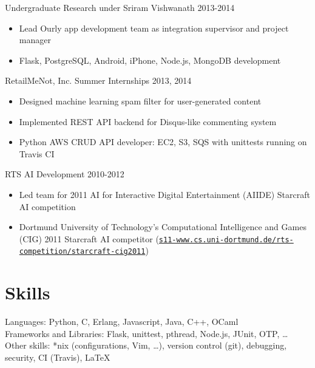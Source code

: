 \documentclass[line,margin]{res}
\begin{document}
\begin{resume}
\vspace{-6pt}
Undergraduate Research under Sriram Vishwanath
\hfill  2013-2014
    \begin{itemize} \itemsep -2pt %
    \item Lead Ourly app development team as integration supervisor and project manager
    \item Flask, PostgreSQL, Android, iPhone, Node.js, MongoDB development
    \end{itemize}

\vspace{-6pt}
RetailMeNot, Inc. Summer Internships
\hfill  2013, 2014
    \begin{itemize} \itemsep -2pt %
    \item Designed machine learning spam filter for user-generated content
    \item Implemented REST API backend for Disqus-like commenting system
    \item Python AWS CRUD API developer: EC2, S3, SQS with unittests running on Travis CI
    \end{itemize}

\vspace{-6pt}
RTS AI Development
\hfill  2010-2012
    \begin{itemize} \itemsep -2pt %
    \item Led team for 2011 AI for Interactive Digital Entertainment (AIIDE) Starcraft AI competition  
    \item Dortmund University of Technology’s Computational Intelligence and Games (CIG) 2011 Starcraft AI
        competitor (\href{https://www.s11-www.cs.uni-dortmund.de/rts-competition/starcraft-cig2011}{\texttt{s11-www.cs.uni-dortmund.de/rts-competition/starcraft-cig2011}})
    \end{itemize}


\vspace{-8pt}
\section{Skills}
\vspace{12pt} 
    Languages: Python, C, Erlang, Javascript, Java, C++, OCaml \\ 
    Frameworks and Libraries: Flask, unittest, pthread, Node.js, JUnit, OTP, \ldots \\
    Other skills: *nix (configurations, Vim, \ldots), version control (git), debugging, security, CI (Travis), \LaTeX



\end{resume}
\end{document}
